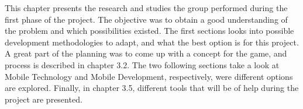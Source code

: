 This chapter presents the research and studies the group performed during the first phase of the project. The objective was to obtain a good understanding of the problem and which possibilities existed. The first sections looks into possible development methodologies to adapt, and what the best option is for this project. A great part of the planning was to come up with a concept for the game, and process is described in chapter 3.2. The two following sections take a look at Mobile Technology and Mobile Development, respectively, were different options are explored. Finally, in chapter 3.5, different tools that will be of help during the project are presented.